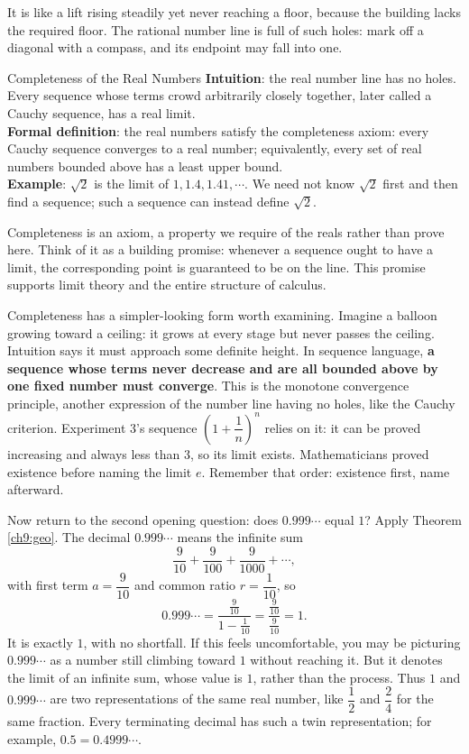 It is like a lift rising steadily yet never reaching a floor, because the building lacks the required floor. The rational number line is full of such holes: mark off a diagonal with a compass, and its endpoint may fall into one.

\begin{shuyu}{Completeness of the Real Numbers}
\textbf{Intuition}: the real number line has no holes. Every sequence whose terms crowd arbitrarily closely together, later called a Cauchy sequence, has a real limit.\\
\textbf{Formal definition}: the real numbers satisfy the completeness axiom: every Cauchy sequence converges to a real number; equivalently, every set of real numbers bounded above has a least upper bound.\\
\textbf{Example}: $\sqrt{2}$ is the limit of $1,1.4,1.41,\cdots$. We need not know $\sqrt{2}$ first and then find a sequence; such a sequence can instead define $\sqrt{2}$.
\end{shuyu}

Completeness is an axiom, a property we require of the reals rather than prove here. Think of it as a building promise: whenever a sequence ought to have a limit, the corresponding point is guaranteed to be on the line. This promise supports limit theory and the entire structure of calculus.

Completeness has a simpler-looking form worth examining. Imagine a balloon growing toward a ceiling: it grows at every stage but never passes the ceiling. Intuition says it must approach some definite height. In sequence language, \textbf{a sequence whose terms never decrease and are all bounded above by one fixed number must converge}. This is the monotone convergence principle, another expression of the number line having no holes, like the Cauchy criterion. Experiment 3's sequence $\left(1+\dfrac{1}{n}\right)^n$ relies on it: it can be proved increasing and always less than $3$, so its limit exists. Mathematicians proved existence before naming the limit $e$. Remember that order: existence first, name afterward.

Now return to the second opening question: does $0.999\cdots$ equal $1$? Apply Theorem \ref{ch9:geo}. The decimal $0.999\cdots$ means the infinite sum
\[
\frac{9}{10}+\frac{9}{100}+\frac{9}{1000}+\cdots,
\]
with first term $a=\dfrac{9}{10}$ and common ratio $r=\dfrac{1}{10}$, so
\[
0.999\cdots=\frac{\frac{9}{10}}{1-\frac{1}{10}}=\frac{\frac{9}{10}}{\frac{9}{10}}=1.
\]
It is exactly $1$, with no shortfall. If this feels uncomfortable, you may be picturing $0.999\cdots$ as a number still climbing toward $1$ without reaching it. But it denotes the limit of an infinite sum, whose value is $1$, rather than the process. Thus $1$ and $0.999\cdots$ are two representations of the same real number, like $\dfrac{1}{2}$ and $\dfrac{2}{4}$ for the same fraction. Every terminating decimal has such a twin representation; for example, $0.5=0.4999\cdots$.

